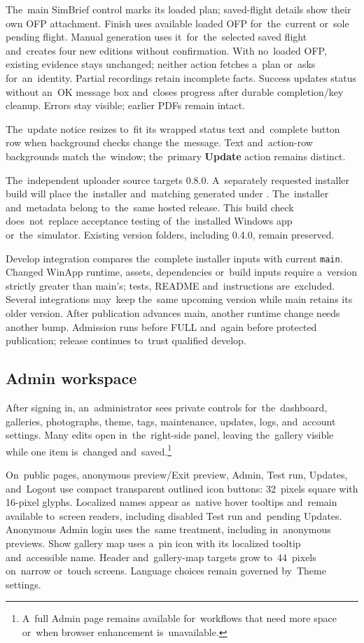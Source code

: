 \documentclass[11pt,a4paper]{article}
\newcommand{\filepath}[1]{\path{#1}}
\newcommand{\ui}[1]{\textbf{#1}}
\begin{document}
The~main SimBrief control marks its loaded plan; saved-flight details show
their own OFP attachment. Finish uses available loaded OFP for~the~current
or~sole pending flight. Manual generation uses it~for~the~selected saved flight
and~creates four new editions without confirmation. With no~loaded OFP, existing
evidence stays unchanged; neither action fetches a~plan or~asks for~an~identity.
Partial recordings retain incomplete facts. Success updates status without
an~OK message box and~closes progress after durable completion/key cleanup.
Errors stay visible; earlier PDFs remain intact.

The~update notice resizes to~fit its wrapped status text and~complete button row
when background checks change the~message. Text and~action-row backgrounds match
the~window; the~primary \ui{Update} action remains distinct.

The~independent uploader source targets 0.8.0. A~separately requested installer
build will place the~installer and~matching generated
\filepath{winapp-update.json} under \filepath{winapp/dist/0.8.0/}. The~installer
and~metadata belong to~the~same hosted release. This build check
does~not~replace
acceptance testing of~the~installed Windows app or~the~simulator. Existing
version folders, including 0.4.0, remain preserved.

Develop integration compares the~complete installer inputs with current
\texttt{main}. Changed WinApp runtime, assets, dependencies or~build inputs
require a~version strictly greater than main's; tests, README and~instructions
are~excluded. Several integrations may~keep the~same upcoming version while
main retains its older version. After publication advances main, another runtime
change needs another bump. Admission runs before FULL and~again before protected
publication; release continues to~trust qualified develop.

\subsection{Admin workspace}

After signing in, an~administrator sees private controls for~the~dashboard,
galleries, photographs, theme, tags, maintenance, updates, logs, and~account
settings. Many edits open in~the~right-side panel, leaving the~gallery visible
while one item is~changed and~saved.\footnote{A~full Admin page remains
available for~workflows that need more space or~when browser enhancement
is~unavailable.}

On~public pages, anonymous preview/Exit preview, Admin, Test run, Updates,
and~Logout use compact transparent outlined icon buttons: 32~pixels square
with 16-pixel glyphs. Localized names appear as~native hover tooltips and~remain
available to~screen readers, including disabled Test run and~pending Updates.
Anonymous Admin login uses the~same treatment, including in~anonymous previews.
Show gallery map uses a~pin icon with its localized tooltip and~accessible name.
Header and~gallery-map targets grow to~44~pixels on~narrow or~touch screens.
Language choices remain governed by~Theme settings.
\end{document}
